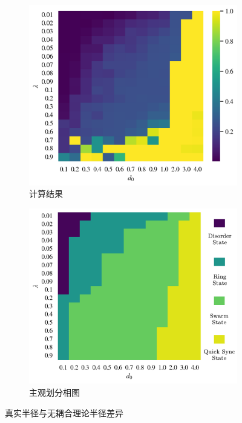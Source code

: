 \documentclass{article}
\begin{document}
\vspace{-0.5cm}
\begin{figure}[H]
	\centering
	\begin{subfigure}[b]{0.49\textwidth}
		\includegraphics[width=\textwidth]{./figs/radiusTheryDiff.png}
		\vspace{-1cm}
		\caption{计算结果}
		
	\end{subfigure}
	\begin{subfigure}[b]{0.49\textwidth}
		\includegraphics[width=\textwidth]{./figs/subjectiveOp.png}
		\vspace{-1cm}
		\caption{主观划分相图}
	\end{subfigure}
	\vspace{-0.5cm}
	\caption{真实半径与无耦合理论半径差异}
	\label{fig:fig234c.9}
\end{figure}
\end{document}
